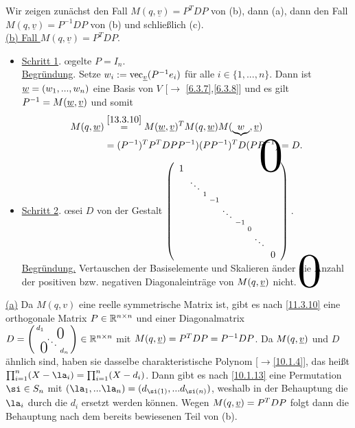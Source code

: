 \documentclass[../../main.tex]{subfiles}
\begin{document}
\begin{cproof}
Wir zeigen zunächst den Fall $M(q,\underline{v})=P^TDP$ von (b), dann (a), dann den Fall $M(q,\underline{v})=P^{-1}DP$ von (b) und schließlich (c).\\

\noindent\underline{(b) Fall $M(q,\underline{v})=P^TDP$}.
\begin{itemize}
\item[ ]\underline{Schritt 1}. \oe gelte $P=I_n$.\\
\underline{Begründung}. Setze $w_i:=\operatorname{vec}_{{\underline v}}(P^{-1}e_i)$ für alle $i\in\{1,...,n\}$. Dann ist ${\underline w}=(w_1,...,w_n)$ eine Basis von $V$ [$\to$ \ref{6.3.7},\ref{6.3.8}] und es gilt $P^{-1}=M({\underline w},{\underline v})$ und somit 
\begin{align*}
M(q,\underline{w})&\stackrel{\ref{13.3.10}}{=}M(\underline{w},\underline{v})^TM(q,\underline{w})M(\underbrace{w},\underline{v})\\
&=(P^{-1})^TP^TDPP^{-1})(PP^{-1})^TD(PP^{-1})=D.
\end{align*}
\item[ ]\underline{Schritt 2}. \oe sei $D$ von der Gestalt $\left(\begin{smallmatrix}
\tikz\node(c){$1$};\\
&\ddots\\
&&1\\
&&&-1\\
&&&&\ddots\\
&&&&&-1\\
&&&&&&0\\
&&&&&&&\ddots\\
&&&&&&&&\tikz\node(d){$0$};
\end{smallmatrix}\right)
\begin{tikzpicture}[overlay]
\node[below right of = c,xshift=0em,yshift=-4em,scale=5]{$0$};
\node[above left of = d,xshift=0em,yshift=4em,scale=5]{$0$};
\end{tikzpicture}$.\\
\underline{Begründung.} Vertauschen der Basiselemente und Skalieren änder die Anzahl der positiven bzw. negativen Diagonaleinträge von $M(q,{\underline v})$ nicht.
\end{itemize}
	
\noindent\underline{(a)} Da $M(q,v)$ eine reelle symmetrische Matrix ist, gibt es nach \ref{11.3.10} eine orthogonale Matrix $P\in \mathbb R^{n\times n}$ und einer Diagonalmatrix $D=\left(\begin{smallmatrix}
d_1 & & \llap{$\overset{\blap{\LARGE 0}}{~}$} \\
& \ddots &\\
\rlap{\tlap{\LARGE 0}} & & d_n\end{smallmatrix}\right)\in \R^{n\times n}$ mit $M(q,{\underline v})=P^TDP=P^{-1}DP$. Da $M(q,{\underline v})$ und $D$ ähnlich sind, haben sie dasselbe charakteristische Polynom [$\to$\ref{10.1.4}], das heißt $\prod_{i=1}^n(X-\la_i)=\prod_{i=1}^n(X-d_i)$. Dann gibt es nach \ref{10.1.13} eine Permutation $\si\in S_n$ mit $(\la_1,...\la_n)=(d_{\si(1)},...d_{\si(n)})$, weshalb in der Behauptung die $\la_i$ durch die $d_i$ ersetzt werden können. Wegen $M(q,{\underline v})=P^TDP$ folgt dann die Behauptung nach dem bereits bewiesenen Teil von (b).\\
		

\end{cproof}
\end{document}
